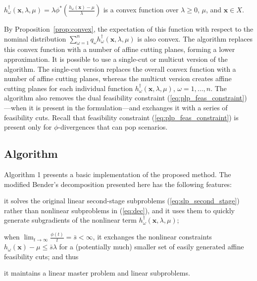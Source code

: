 \documentclass[opre,nonblindrev]{informs3} %
\newcommand{\x}{\mathbf{x}}
\begin{document}
\begin{proposition}\label{prop:convex}
$h^{\dagger}_\omega(\x, \lambda, \mu) = \lambda \phi^*\left(\frac{h_\omega(\x) - \mu}{\lambda}\right)$ is a convex function over $\lambda \geq 0$, $\mu$, and $\x \in X$. 
\end{proposition} 


By Proposition~\ref{prop:convex}, the expectation of this function with respect to the nominal distribution $\sum_{\omega=1}^{n} q_\omega h^{\dagger}_\omega(\x, \lambda, \mu)$ is also convex.
The algorithm replaces this convex function with a number of affine cutting planes, forming a lower approximation. 
It is possible to use a single-cut or multicut version of the algorithm. 
The single-cut version replaces the overall convex function with a number of affine cutting planes, whereas the multicut version creates affine cutting planes for each individual function $h^{\dagger}_\omega(\x, \lambda, \mu)$, $\omega = 1,\ldots,n$. 
The algorithm also removes the dual feasibility constraint (\ref{eq:plp_feas_constraint})---when it is present in the formulation---and exchanges it with a series of feasibility cuts.
Recall that feasibility constraint (\ref{eq:plp_feas_constraint}) is present only for $\phi$-divergences that can pop scenarios. 
  


\subsection{Algorithm}
\label{ssec:algo}

Algorithm 1 presents a basic implementation of the proposed method. 
The modified Bender's decomposition presented here has the following features:
\begin{inparaenum}
	\item it solves the original linear second-stage subproblems (\ref{eq:slp_second_stage}) rather than nonlinear subproblems in (\ref{eq:dec}), and it uses them to quickly generate subgradients of the nonlinear term $h^{\dagger}_\omega(\x, \lambda, \mu)$; 
	\item when $\lim_{t \rightarrow \infty}\frac{\phi(t)}{t}=\bar{s}<\infty$, it exchanges the nonlinear constraints $h_\omega(\x) - \mu \leq \bar{s} \lambda$ for a (potentially much) smaller set of easily generated affine feasibility cuts; and thus
	\item  it maintains a linear master problem and linear subproblems.
\end{inparaenum}
\end{document}
